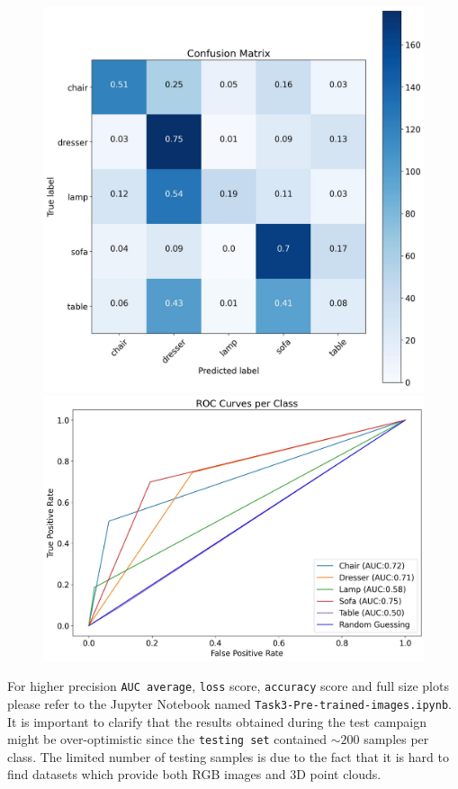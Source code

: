 \documentclass[11pt,a4paper]{article}
\begin{document}
\begin{figure}[H]
{{    \includegraphics[scale=0.13]{imgs/experiments/images/9-2/Experiment-9-2-TESTING-confusion-matrix.jpg}
    \includegraphics[scale=0.13]{imgs/experiments/images/9-2/Experiment-9-2-TESTING-ROC.jpg}
    }}
\end{figure}
\noindent
For higher precision \texttt{AUC average}, \texttt{loss} score, \texttt{accuracy} score and full size plots please refer to the Jupyter Notebook named \texttt{Task3-Pre-trained-images.ipynb}. It is important to clarify that the results obtained during the test campaign might be over-optimistic since the \texttt{testing set} contained $\sim 200$ samples per class. The limited number of testing samples is due to the fact that it is hard to find datasets which provide both RGB images and 3D point clouds.
\end{document}
